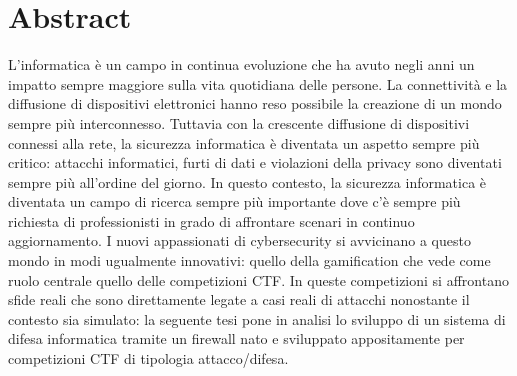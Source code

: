 \chapter*{Abstract}

L'informatica è un campo in continua evoluzione che ha avuto negli anni un impatto sempre maggiore sulla vita quotidiana delle persone.
La connettività e la diffusione di dispositivi elettronici hanno reso possibile la creazione di un mondo sempre più interconnesso.
Tuttavia con la crescente diffusione di dispositivi connessi alla rete, la sicurezza informatica è diventata un aspetto sempre più critico:
attacchi informatici, furti di dati e violazioni della privacy sono diventati sempre più all'ordine del giorno.
In questo contesto, la sicurezza informatica è diventata un campo di ricerca sempre più importante dove c'è sempre più richiesta di professionisti
in grado di affrontare scenari in continuo aggiornamento.
I nuovi appassionati di cybersecurity si avvicinano a questo mondo in modi ugualmente innovativi:
quello della gamification che vede come ruolo centrale quello delle competizioni CTF.
In queste competizioni si affrontano sfide reali che sono direttamente legate a casi reali di attacchi nonostante il contesto sia simulato:
la seguente tesi pone in analisi lo sviluppo di un sistema di difesa informatica tramite un firewall nato e sviluppato
appositamente per competizioni CTF di tipologia attacco/difesa.